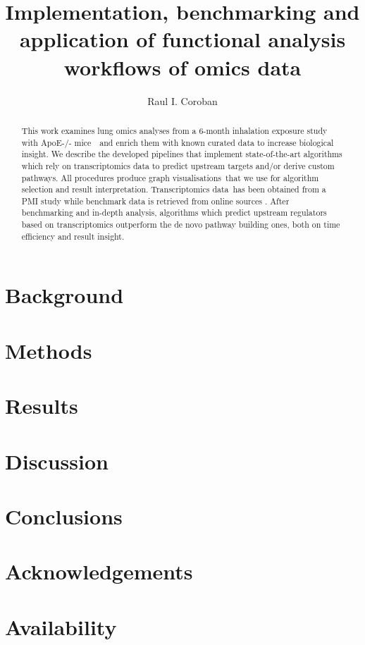 \documentclass{jot}
\title{Implementation, benchmarking and application of functional analysis workflows of omics data}
\author[affiliation=orgname, nowrap] %
    {Raul I. Coroban}
    {is ...
    Contact him at \email{r.coroban@student.vu.nl}}
\begin{document}
\begin{abstract}
This work examines lung omics analyses from a 6-month inhalation exposure study with ApoE-/- mice  and enrich them with known curated data to increase biological insight. We describe the developed pipelines that implement state-of-the-art algorithms which rely on transcriptomics data to predict upstream targets and/or derive custom pathways. All procedures produce graph visualisations that we use for algorithm selection and result interpretation. Transcriptomics data has been obtained from a PMI study \cite{Titz2020Multi-omicsSmoke} while benchmark data is retrieved from online sources \cite{Wang2020TherapeuticTherapeutics} \cite{Subramanian2017AProfiles}. After benchmarking and in-depth analysis, algorithms which predict upstream regulators based on transcriptomics outperform the de novo pathway building ones, both on time efficiency and result insight.
\end{abstract}


\section{Background}
\label{section:background}


\section{Methods}
\label{section:methods}


\section{Results}
\label{section:results}


\section{Discussion}
\label{section:discussion}


\section{Conclusions}
\label{section:conclusions}


\section{Acknowledgements}


\section{Availability}






\end{document}
